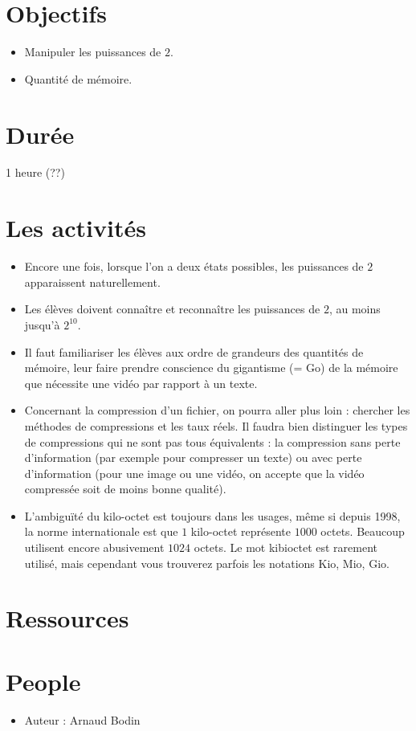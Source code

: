 \documentclass[class=report,crop=false, 12pt]{standalone}
\begin{document}



\section*{Objectifs}

\begin{itemize}
  \item Manipuler les puissances de $2$.
  \item Quantité de mémoire.
\end{itemize}


\section*{Durée}

1 heure (??)

\section*{Les activités}

\begin{itemize}
  \item Encore une fois, lorsque l'on a deux états possibles, les puissances de $2$ apparaissent naturellement.
  
  \item Les élèves doivent connaître et reconnaître les puissances de $2$, au moins jusqu'à $2^{10}$.
  
  \item Il faut familiariser les élèves aux ordre de grandeurs des quantités de mémoire, leur faire prendre conscience du gigantisme (= Go) de la mémoire que nécessite une vidéo par rapport à un texte.
  
  \item Concernant la compression d'un fichier, on pourra aller plus loin : chercher les méthodes de compressions et les taux réels. Il faudra bien distinguer les types de compressions qui ne sont pas tous équivalents : la compression sans perte d'information (par exemple pour compresser un texte) ou avec perte d'information (pour une image ou une vidéo, on accepte que la vidéo compressée soit de moins bonne qualité).
  
  \item L’ambiguïté du kilo-octet est toujours dans les usages, même si depuis 1998, la norme internationale est que $1$ kilo-octet représente $1000$ octets. Beaucoup utilisent encore abusivement $1024$ octets. Le mot kibioctet est rarement utilisé, mais cependant vous trouverez parfois les notations Kio, Mio, Gio.
\end{itemize}


\section*{Ressources}


\section*{People}

\begin{itemize}
  \item Auteur : Arnaud Bodin
\end{itemize}
\end{document}
